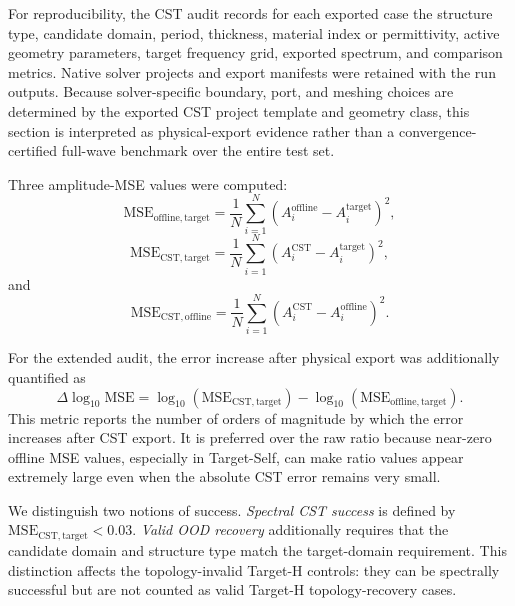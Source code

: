 \documentclass[final,1p,times]{elsarticle}
\begin{document}
For reproducibility, the CST audit records for each exported case the structure type, candidate domain, period, thickness, material index or permittivity, active geometry parameters, target frequency grid, exported spectrum, and comparison metrics. Native solver projects and export manifests were retained with the run outputs. Because solver-specific boundary, port, and meshing choices are determined by the exported CST project template and geometry class, this section is interpreted as physical-export evidence rather than a convergence-certified full-wave benchmark over the entire test set.

Three amplitude-MSE values were computed:
\begin{equation}
\mathrm{MSE}_{\mathrm{offline,target}}
=
\frac{1}{N}\sum_{i=1}^{N}
\left(A^{\mathrm{offline}}_i-A^{\mathrm{target}}_i\right)^2,
\end{equation}
\begin{equation}
\mathrm{MSE}_{\mathrm{CST,target}}
=
\frac{1}{N}\sum_{i=1}^{N}
\left(A^{\mathrm{CST}}_i-A^{\mathrm{target}}_i\right)^2,
\end{equation}
and
\begin{equation}
\mathrm{MSE}_{\mathrm{CST,offline}}
=
\frac{1}{N}\sum_{i=1}^{N}
\left(A^{\mathrm{CST}}_i-A^{\mathrm{offline}}_i\right)^2.
\end{equation}

For the extended audit, the error increase after physical export was additionally quantified as
\begin{equation}
\Delta\log_{10}\mathrm{MSE}
=
\log_{10}\left(\mathrm{MSE}_{\mathrm{CST,target}}\right)
-
\log_{10}\left(\mathrm{MSE}_{\mathrm{offline,target}}\right).
\end{equation}
This metric reports the number of orders of magnitude by which the error increases after CST export. It is preferred over the raw ratio because near-zero offline MSE values, especially in Target-Self, can make ratio values appear extremely large even when the absolute CST error remains very small.

We distinguish two notions of success. \emph{Spectral CST success} is defined by $\mathrm{MSE}_{\mathrm{CST,target}}<0.03$. \emph{Valid OOD recovery} additionally requires that the candidate domain and structure type match the target-domain requirement. This distinction affects the topology-invalid Target-H controls: they can be spectrally successful but are not counted as valid Target-H topology-recovery cases.
\end{document}
